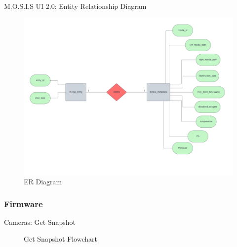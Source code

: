 \documentclass[17pt, aspectratio=169]{beamer}
\begin{document}
\begin{frame}{M.O.S.I.S UI 2.0: Entity Relationship Diagram}
	\begin{figure}
		\includegraphics[page=1,height=0.65\textheight]{../../Progress_Report_Document/Appendix/Design_Documentation/ER_Diagram/Figures/ER_Diagram_MOSIS.pdf}
		\caption{ER Diagram}
	\end{figure}
\end{frame}
\subsubsection{Firmware}
\begin{frame}{Cameras: Get Snapshot}
	\begin{figure}[H]
		\begin{center}
			\begin{small}
			\end{small}
		\end{center}
		\caption{Get Snapshot Flowchart}
	\end{figure}
\end{frame}
\end{document}
